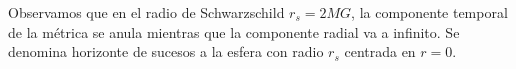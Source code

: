 Observamos que en el radio de Schwarzschild $r_s=2MG$, la componente temporal de la 
métrica se anula mientras que la componente radial va a infinito.
Se denomina horizonte de sucesos a la esfera con radio $r_s$ centrada en $r=0$.









%
%
%
%
%
%
